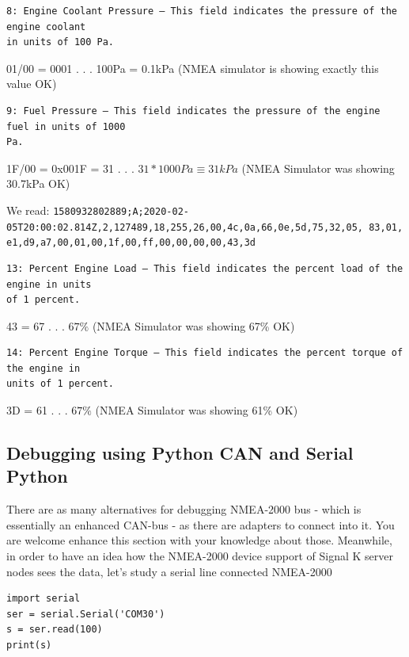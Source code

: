 \documentclass[11pt]{article}
\begin{document}
\begin{verbatim}
8: Engine Coolant Pressure – This field indicates the pressure of the engine coolant
in units of 100 Pa.
\end{verbatim}

01/00 = 0001 . . . 100Pa = 0.1kPa (NMEA simulator is showing exactly
this value OK)

    \begin{verbatim}
9: Fuel Pressure – This field indicates the pressure of the engine fuel in units of 1000
Pa.
\end{verbatim}

1F/00 = 0x001F = 31 . . . \(31*1000Pa\equiv31kPa\) (NMEA Simulator was
showing 30.7kPa OK)

    We read:
\texttt{1580932802889;A;2020-02-05T20:00:02.814Z,2,127489,18,255,26,00,4c,0a,66,0e,5d,75,32,05,\ 83,01,e1,d9,a7,00,01,00,1f,00,ff,00,00,00,00,43,3d}

\begin{verbatim}
13: Percent Engine Load – This field indicates the percent load of the engine in units
of 1 percent.
\end{verbatim}

43 = 67 . . . \(67\%\) (NMEA Simulator was showing 67\% OK)

    \begin{verbatim}
14: Percent Engine Torque – This field indicates the percent torque of the engine in
units of 1 percent. 
\end{verbatim}

3D = 61 . . . \(67\%\) (NMEA Simulator was showing 61\% OK)

    \hypertarget{debugging-using-python-can-and-serial-python}{%
\subsection{Debugging using Python CAN and Serial
Python}\label{debugging-using-python-can-and-serial-python}}

    There are as many alternatives for debugging NMEA-2000 bus - which is
essentially an enhanced CAN-bus - as there are adapters to connect into
it. You are welcome enhance this section with your knowledge about
those. Meanwhile, in order to have an idea how the NMEA-2000 device
support of Signal K server nodes sees the data, let's study a serial
line connected NMEA-2000

    \begin{verbatim}
import serial
ser = serial.Serial('COM30')
s = ser.read(100)
print(s)
\end{verbatim}
\end{document}
